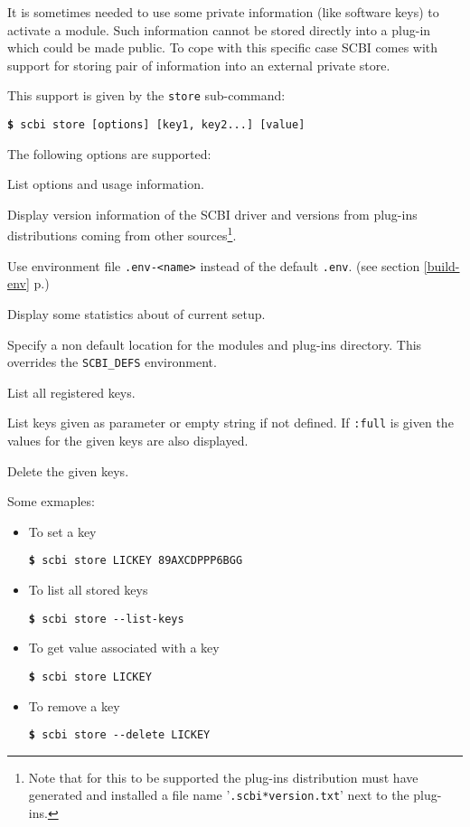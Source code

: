 \documentclass[a4paper,12pt,twoside]{article}
\newcommand{\code}[1]{\texttt{#1}}
\newcommand{\seeref}[1]{see section \ref{#1} p.\pageref{#1}}
\newcommand{\file}[1]{'{\texttt{#1}}'}
\newcommand{\cmd}[1]{\tabto{1cm}\hspace{0.5cm}\texttt{\textbf{\$} #1}}
\newcommand{\ddash}{-{}-}
\begin{document}
It is sometimes needed to use some private information (like software keys) to activate a module. Such information cannot be stored directly into a plug-in which could be made public. To cope with this specific case SCBI comes with support for storing pair of information into an external private store.

This support is given by the \code{store} sub-command:

\cmd{scbi store [options] [key1, key2...] [value]}

The following options are supported:

\begin{description}[font=\texttt]
	\item[-h | \ddash{}help] List options and usage information.

	\item[-v | \ddash{}version] Display version information of the SCBI driver and versions from plug-ins distributions coming from other sources\footnote{Note that for this to be supported the plug-ins distribution must have generated and installed a file name \file{.scbi*version.txt} next to the plug-ins.}.

	\item[-e | \ddash{}env=<name>] Use environment file \code{.env-<name>} instead of the default \code{.env}. (\seeref{build-env})

	\item[\ddash{}stat] Display some statistics about of current setup.

	\item[\ddash{}plugins=<directory>] Specify a non default location for the modules and plug-ins directory. This overrides the \code{SCBI\_DEFS} environment.

	\item[\ddash{}list-keys] List all registered keys.

	\item[\ddash{}list{[}:full{]}] List keys given as parameter or empty string if not defined. If \code{:full} is given the values for the given keys are also displayed.

	\item[-d | \ddash{}delete] Delete the given keys.
\end{description}

Some exmaples:

\begin{itemize}
	\item To set a key

	\cmd{scbi store LICKEY 89AXCDPPP6BGG}

	\item To list all stored keys

	\cmd{scbi store \ddash{}list-keys}

	\item To get value associated with a key

	\cmd{scbi store LICKEY}

	\item To remove a key

    \cmd{scbi store \ddash{}delete LICKEY}
\end{itemize}
\end{document}
